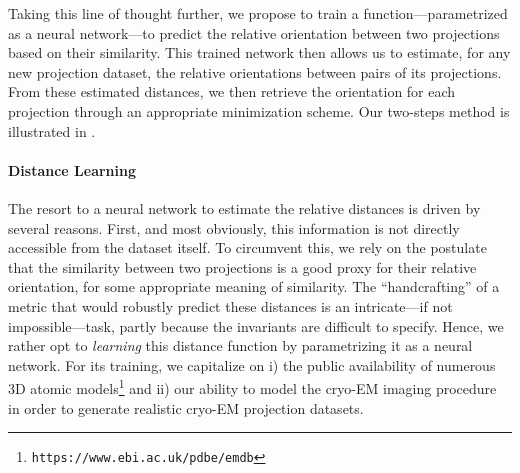 Taking this line of thought further, we propose to train a function---parametrized as a neural network---to predict the relative orientation between two projections based on their similarity. This trained network then allows us to estimate, for any new projection dataset, the relative orientations between pairs of its projections. From these estimated distances, we then retrieve the orientation for each projection through an appropriate minimization scheme. Our two-steps method is illustrated in . 



\paragraph{Distance Learning}
The resort to a neural network to estimate the relative distances is driven by several reasons. First, and most obviously, this information is not directly accessible from the dataset itself. To circumvent this, we rely on the postulate that the similarity between two projections is a good proxy for their relative orientation, for some appropriate meaning of similarity. The ``handcrafting'' of a metric that would robustly predict these distances is an intricate---if not impossible---task, partly because the invariants are difficult to specify. Hence, we rather opt to \textit{learning} this distance function by parametrizing it as a neural network. For its training, we capitalize on i) the public availability of numerous 3D atomic models\footnote{\texttt{https://www.ebi.ac.uk/pdbe/emdb}} and ii) our ability to model the cryo-EM imaging procedure in order to generate realistic cryo-EM projection datasets. 


